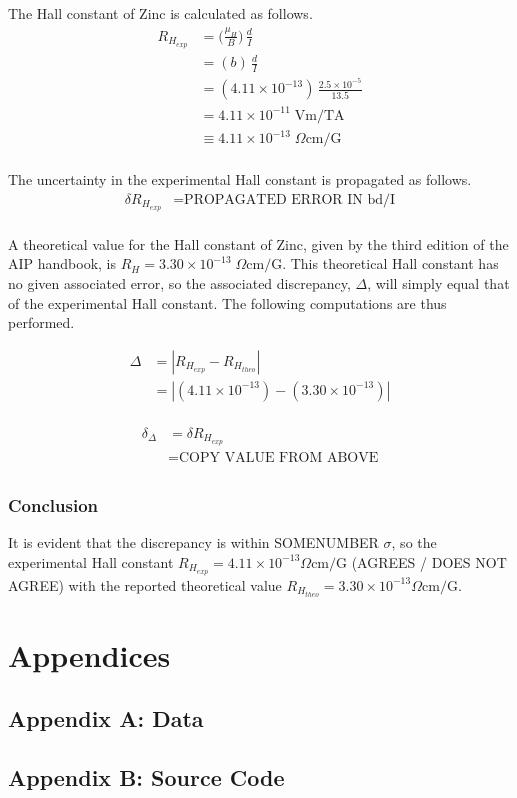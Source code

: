 \documentclass[a4paper]{article}
\begin{document}
The Hall constant of Zinc is calculated as follows.
\begin{align*}
R_{H_{exp}} &= \big( \frac{\mu_H}{B} \big) \, \frac{d}{I} \\
    &= (b) \, \frac{d}{I} \\
    &= (4.11 \times 10^{-13}) \, \frac{2.5 \times 10^{-5}}{13.5} \\
    &= 4.11 \times 10^{-11} \; \text{Vm/TA} \\
    &\equiv 4.11 \times 10^{-13} \; \Omega \text{cm/G} \\
\end{align*}

The uncertainty in the experimental Hall constant is propagated as follows.
\begin{align*}
\delta R_{H_{exp}} &= \text{PROPAGATED ERROR IN bd/I} \\
\end{align*}

\qq A theoretical value for the Hall constant of Zinc, given by the
third edition of the AIP handbook, is $R_H = 3.30 \times 10^{-13} \;
\Omega \text{cm/G}$. This theoretical Hall constant has no given
associated error, so the associated discrepancy, $\Delta$, will simply
equal that of the experimental Hall constant. The following
computations are thus performed.

\begin{align*}
\Delta &= | R_{H_{exp}} - R_{H_{theo}} | \\
	   &= | (4.11 \times 10^{-13}) - (3.30 \times 10^{-13}) | \\
\end{align*}

\begin{align*}
\delta_{\Delta} &= \delta R_{H_{exp}} \\
				&= \text{COPY VALUE FROM ABOVE} \\
\end{align*}

\subsubsection{Conclusion}
\qq It is evident that the discrepancy is within SOMENUMBER $\sigma$,
so the experimental Hall constant $R_{H_{exp}} = 4.11 \times 10^{-13}
\Omega \text{cm/G}$ (AGREES / DOES NOT AGREE) with the reported
theoretical value $R_{H_{theo}} = 3.30 \times 10^{-13} \Omega
\text{cm/G}$.

\section{Appendices}

\subsection{Appendix A: Data}

\subsection{Appendix B: Source Code}
\end{document}
